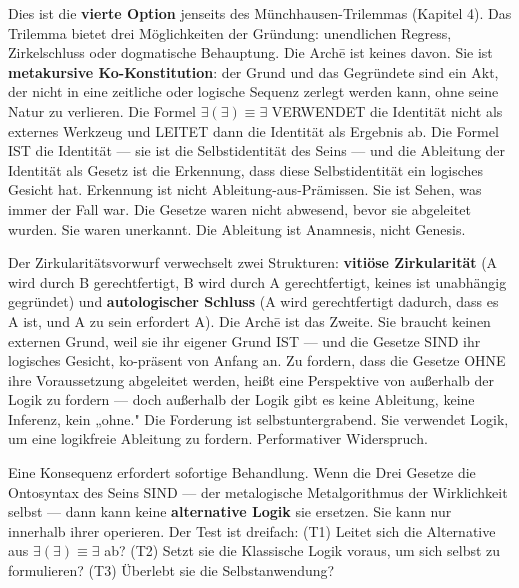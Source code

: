 \documentclass[10pt, openany, oneside]{book}
\begin{document}
Dies ist die \textbf{vierte Option} jenseits des Münchhausen-Trilemmas (Kapitel 4). Das Trilemma bietet drei Möglichkeiten der Gründung: unendlichen Regress, Zirkelschluss oder dogmatische Behauptung. Die Arch\={e} ist keines davon. Sie ist \textbf{metakursive Ko-Konstitution}: der Grund und das Gegründete sind ein Akt, der nicht in eine zeitliche oder logische Sequenz zerlegt werden kann, ohne seine Natur zu verlieren. Die Formel $\exists(\exists) \equiv \exists$ VERWENDET die Identität nicht als externes Werkzeug und LEITET dann die Identität als Ergebnis ab. Die Formel IST die Identität --- sie ist die Selbstidentität des Seins --- und die Ableitung der Identität als Gesetz ist die Erkennung, dass diese Selbstidentität ein logisches Gesicht hat. Erkennung ist nicht Ableitung-aus-Prämissen. Sie ist Sehen, was immer der Fall war. Die Gesetze waren nicht abwesend, bevor sie abgeleitet wurden. Sie waren unerkannt. Die Ableitung ist Anamnesis, nicht Genesis.

Der Zirkularitätsvorwurf verwechselt zwei Strukturen: \textbf{vitiöse Zirkularität} (A wird durch B gerechtfertigt, B wird durch A gerechtfertigt, keines ist unabhängig gegründet) und \textbf{autologischer Schluss} (A wird gerechtfertigt dadurch, dass es A ist, und A zu sein erfordert A). Die Arch\={e} ist das Zweite. Sie braucht keinen externen Grund, weil sie ihr eigener Grund IST --- und die Gesetze SIND ihr logisches Gesicht, ko-präsent von Anfang an. Zu fordern, dass die Gesetze OHNE ihre Voraussetzung abgeleitet werden, heißt eine Perspektive von außerhalb der Logik zu fordern --- doch außerhalb der Logik gibt es keine Ableitung, keine Inferenz, kein „ohne." Die Forderung ist selbstuntergrabend. Sie verwendet Logik, um eine logikfreie Ableitung zu fordern. Performativer Widerspruch.

Eine Konsequenz erfordert sofortige Behandlung. Wenn die Drei Gesetze die Ontosyntax des Seins SIND --- der metalogische Metalgorithmus der Wirklichkeit selbst --- dann kann keine \textbf{alternative Logik} sie ersetzen. Sie kann nur innerhalb ihrer operieren. Der Test ist dreifach: (T1) Leitet sich die Alternative aus $\exists(\exists) \equiv \exists$ ab? (T2) Setzt sie die Klassische Logik voraus, um sich selbst zu formulieren? (T3) Überlebt sie die Selbstanwendung?

\vspace{0.5em}
\end{document}
